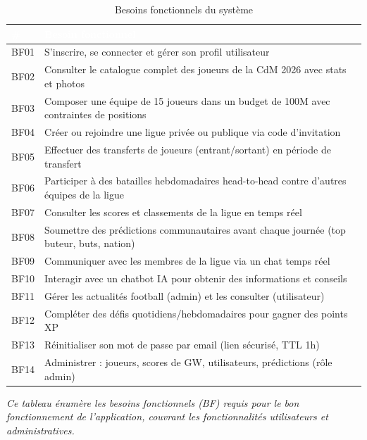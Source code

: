 \begin{table}[!htbp]
\centering
    \begin{tabularx}{\linewidth}{|l|X|}
        \hline
        \rowcolor{emsigreen}\textcolor{white}{\textbf{\#}} & \textcolor{white}{\textbf{Besoin fonctionnel}} \\
        \hline
        BF01 & S'inscrire, se connecter et gérer son profil utilisateur \\
        \hline
        BF02 & Consulter le catalogue complet des joueurs de la CdM 2026 avec stats et photos \\
        \hline
        BF03 & Composer une équipe de 15 joueurs dans un budget de 100M avec contraintes de positions \\
        \hline
        BF04 & Créer ou rejoindre une ligue privée ou publique via code d'invitation \\
        \hline
        BF05 & Effectuer des transferts de joueurs (entrant/sortant) en période de transfert \\
        \hline
        BF06 & Participer à des batailles hebdomadaires head-to-head contre d'autres équipes de la ligue \\
        \hline
        BF07 & Consulter les scores et classements de la ligue en temps réel \\
        \hline
        BF08 & Soumettre des prédictions communautaires avant chaque journée (top buteur, buts, nation) \\
        \hline
        BF09 & Communiquer avec les membres de la ligue via un chat temps réel \\
        \hline
        BF10 & Interagir avec un chatbot IA pour obtenir des informations et conseils \\
        \hline
        BF11 & Gérer les actualités football (admin) et les consulter (utilisateur) \\
        \hline
        BF12 & Compléter des défis quotidiens/hebdomadaires pour gagner des points XP \\
        \hline
        BF13 & Réinitialiser son mot de passe par email (lien sécurisé, TTL 1h) \\
        \hline
        BF14 & Administrer : joueurs, scores de GW, utilisateurs, prédictions (rôle admin) \\
        \hline
    \end{tabularx}
\caption{Besoins fonctionnels du système}
\end{table}

\vspace{0.2cm}
\noindent\small\textit{Ce tableau énumère les besoins fonctionnels (BF) requis pour le bon fonctionnement de l'application, couvrant les fonctionnalités utilisateurs et administratives.}\normalsize

